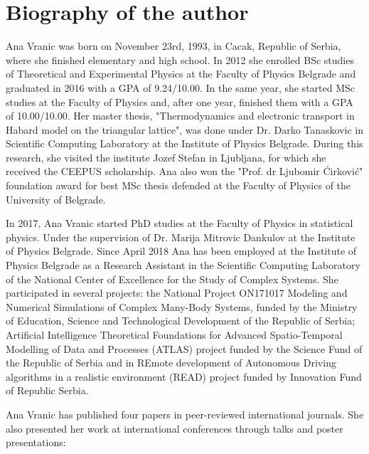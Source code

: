 
\normalsize

\chapter{Biography of the author}

Ana Vranic was born on November 23rd, 1993, in Cacak, Republic of Serbia, where she finished elementary and high school. In 2012 she enrolled BSc studies of Theoretical and Experimental Physics at the Faculty of Physics Belgrade and graduated in 2016 with a GPA of 9.24/10.00. In the same year, she started MSc studies at the Faculty of Physics and, after one year, finished them with a GPA of 10.00/10.00. Her master thesis, "Thermodynamics and electronic transport in Habard model on the triangular lattice", was done under Dr. Darko Tanaskovic in Scientific Computing Laboratory at the Institute of Physics Belgrade. During this research, she visited the institute Jozef Stefan in Ljubljana, for which she received the CEEPUS scholarship. Ana also won the "Prof. dr Ljubomir Ćirković" foundation award for best MSc thesis defended at the Faculty of Physics of the University of Belgrade.

In 2017, Ana Vranic started PhD studies at the Faculty of Physics in statistical physics. Under the supervision of Dr. Marija Mitrovic Dankulov at the Institute of Physics Belgrade. Since April 2018 Ana has been employed at the Institute of Physics Belgrade as a Research Assistant in the Scientific Computing Laboratory of the National Center of Excellence for the Study of Complex Systems. She participated in several projects:  the National Project ON171017 Modeling and Numerical Simulations of Complex Many-Body Systems, funded by the Ministry of Education, Science and Technological Development of the Republic of Serbia; Artificial Intelligence Theoretical Foundations for Advanced Spatio-Temporal Modelling of Data and Processes (ATLAS) project funded by the Science Fund of the Republic of Serbia and in REmote development of Autonomous Driving algorithms in a realistic environment (READ) project funded by Innovation Fund of Republic Serbia.

Ana Vranic has published four papers in peer-reviewed international journals. She also presented her work at international conferences through talks and poster presentations:

